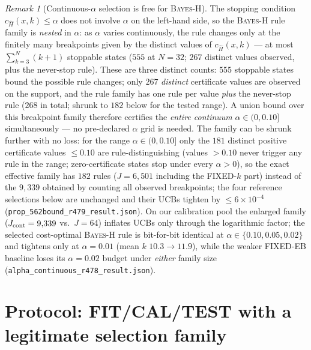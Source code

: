 \documentclass{article}
\theoremstyle{definition}
\theoremstyle{remark}
\newtheorem{remark}{Remark}
\begin{document}
\begin{remark}[Continuous-$\alpha$ selection is free for \textsc{Bayes-H}]
\label{rem:nested}
The stopping condition $c_{\widehat H}(x,k)\le\alpha$ does not involve
$\alpha$ on the left-hand side, so the \textsc{Bayes-H} rule family is
\emph{nested} in $\alpha$: as $\alpha$ varies continuously, the rule changes
only at the finitely many breakpoints given by the distinct values of
$c_{\widehat H}(x,k)$ --- at most $\sum_{k=3}^{N}(k+1)$ stoppable states
($555$ at $N{=}32$; $267$ distinct values observed, plus the never-stop
rule). These are three distinct counts: $555$ stoppable states bound the
possible rule changes; only $267$ \emph{distinct} certificate values are
observed on the support, and the rule family has one rule per value
\emph{plus} the never-stop rule ($268$ in total; shrunk to $182$ below
for the tested range). A union bound over this breakpoint family
therefore
certifies the \emph{entire continuum} $\alpha\in(0,0.10]$
simultaneously --- no pre-declared $\alpha$ grid is needed. The family can
be shrunk further with no loss: for the range $\alpha\in(0,0.10]$ only the
$181$ distinct positive certificate values ${\le}0.10$ are
rule-distinguishing (values $>0.10$ never trigger any rule in the range;
zero-certificate states stop under every $\alpha>0$), so the exact
effective family has $182$ rules ($J=6{,}501$ including the FIXED-$k$ part)
instead of the $9{,}339$ obtained by counting all observed breakpoints; the
four reference selections below are unchanged and their UCBs tighten by
${\le}6\times10^{-4}$ (\texttt{prop\_562bound\_r479\_result.json}). On our
calibration pool the enlarged family
($J_{\rm cont}=9{,}339$ vs.\ $J=64$) inflates UCBs only through the
logarithmic factor; the selected cost-optimal \textsc{Bayes-H} rule is
bit-for-bit identical at $\alpha\in\{0.10,0.05,0.02\}$ and tightens only at
$\alpha=0.01$ (mean $k$ $10.3\!\to\!11.9$), while the weaker FIXED-EB
baseline loses its $\alpha=0.02$ budget under \emph{either} family size
(\texttt{alpha\_continuous\_r478\_result.json}).
\end{remark}

\section{Protocol: FIT/CAL/TEST with a legitimate selection family}
\label{sec:protocol}
\end{document}
